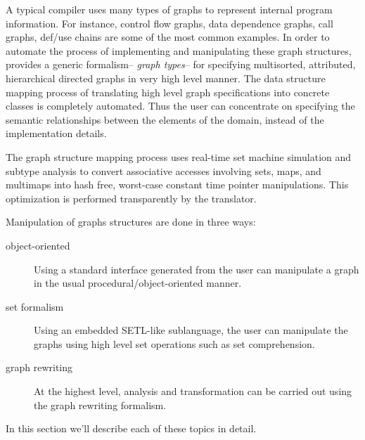  \label{sec:graph}

A typical compiler uses many types of graphs to represent internal program 
information.  For instance, control flow graphs, 
data dependence graphs, call graphs, def/use chains are
some of the most common examples.  In order to automate the process
of implementing and manipulating these graph structures, \Prop{} provides
a generic formalism-- {\em graph types}--
for specifying multisorted, attributed, hierarchical directed graphs in 
very high level manner.  The data structure mapping process of translating
high level graph specifications into concrete \Cpp{} classes is completely
automated.  Thus the user can concentrate on specifying the semantic
relationships between the elements of the domain, instead of the
implementation details.

The graph structure mapping process uses real-time set machine
simulation\cite{real-time-SETL} and subtype analysis\cite{subtype-SETL} 
to convert associative accesses involving sets, maps, and multimaps
into hash free, worst-case constant time pointer manipulations.
This optimization is performed transparently by the translator.

Manipulation of graphs structures are done in three ways: 
\begin{description} 
\item[object-oriented] 
 Using a standard interface generated from \Prop{} the user can 
manipulate a graph in the usual procedural/object-oriented manner. 
\item[set formalism]  Using an embedded SETL\cite{SETL}-like sublanguage, 
the user can manipulate the graphs using high level set operations 
such as set comprehension.  
\item[graph rewriting]  At the highest level, analysis and transformation 
can be carried out using the graph rewriting formalism.  
\end{description}

In this section we'll describe each of these topics in detail.

 \label{sec:graph-types}

